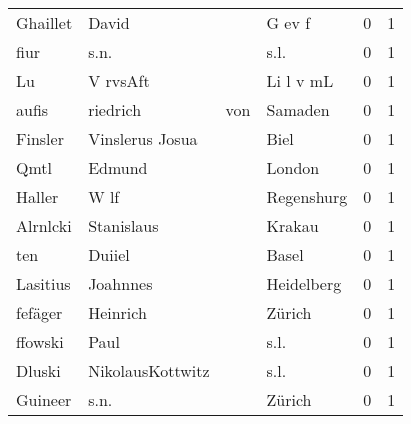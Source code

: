 \begin{center}
\begin{tiny}
\begin{longtabu}{llllrr}
                 Ghaillet &                              David &             &                                      G ev f &          0 &         1 \\
                     fiur &                               s.n. &             &                                        s.l. &          0 &         1 \\
                       Lu &                           V rvsAft &             &                                   Li l v mL &          0 &         1 \\
                    aufis &                           riedrich &         von &                                     Samaden &          0 &         1 \\
                  Finsler &                    Vinslerus Josua &             &                                        Biel &          0 &         1 \\
                     Qmtl &                             Edmund &             &                                      London &          0 &         1 \\
                   Haller &                               W lf &             &                                  Regenshurg &          0 &         1 \\
                 Alrnlcki &                         Stanislaus &             &                                      Krakau &          0 &         1 \\
                      ten &                             Duiiel &             &                                       Basel &          0 &         1 \\
                 Lasitius &                           Joahnnes &             &                                  Heidelberg &          0 &         1 \\
                  fefäger &                           Heinrich &             &                                      Zürich &          0 &         1 \\
                  ffowski &                               Paul &             &                                        s.l. &          0 &         1 \\
                   Dluski &                   NikolausKottwitz &             &                                        s.l. &          0 &         1 \\
                  Guineer &                               s.n. &             &                                      Zürich &          0 &         1 \\

\end{longtabu}
\end{tiny}
\end{center}
